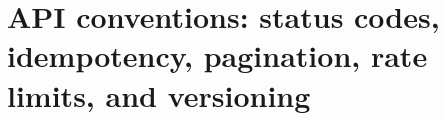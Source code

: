 \chapter{API conventions: status codes, idempotency, pagination, rate limits, and versioning}
\label{ch:api-conventions-status-codes}

